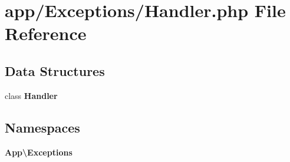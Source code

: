 \section{app/\+Exceptions/\+Handler.php File Reference}
\label{app_2_exceptions_2_handler_8php}
\subsection*{Data Structures}
\begin{DoxyCompactItemize}
\item 
class {\bf Handler}
\end{DoxyCompactItemize}
\subsection*{Namespaces}
\begin{DoxyCompactItemize}
\item 
 {\bf App\textbackslash{}\+Exceptions}
\end{DoxyCompactItemize}
